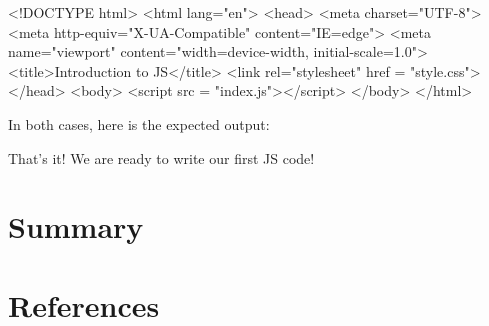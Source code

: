 \documentclass[
  letterpaper,
  DIV=11,
  numbers=noendperiod]{scrreprt}
\newenvironment{Shaded}{\begin{snugshade}}{\end{snugshade}}
\newcommand{\DataTypeTok}[1]{\textcolor[rgb]{0.68,0.00,0.00}{#1}}
\newcommand{\ErrorTok}[1]{\textcolor[rgb]{0.68,0.00,0.00}{#1}}
\newcommand{\KeywordTok}[1]{\textcolor[rgb]{0.00,0.23,0.31}{#1}}
\newcommand{\NormalTok}[1]{\textcolor[rgb]{0.00,0.23,0.31}{#1}}
\newcommand{\OtherTok}[1]{\textcolor[rgb]{0.00,0.23,0.31}{#1}}
\newcommand{\StringTok}[1]{\textcolor[rgb]{0.13,0.47,0.30}{#1}}
\newlength{\cslhangindent}
\newlength{\cslentryspacingunit} %
\newenvironment{CSLReferences}[2] %
 {%
  \setlength{\parindent}{0pt}
  \ifodd #1
  \let\oldpar\par
  \def\par{\hangindent=\cslhangindent\oldpar}
  \fi
  \setlength{\parskip}{#2\cslentryspacingunit}
 }%
 {}
\begin{document}
\begin{Shaded}
\begin{Highlighting}[]
\DataTypeTok{\textless{}!DOCTYPE }\NormalTok{html}\DataTypeTok{\textgreater{}}
\KeywordTok{\textless{}html} \ErrorTok{lang}\OtherTok{=}\StringTok{"en"}\KeywordTok{\textgreater{}}
\KeywordTok{\textless{}head\textgreater{}}
    \KeywordTok{\textless{}meta} \ErrorTok{charset}\OtherTok{=}\StringTok{"UTF{-}8"}\KeywordTok{\textgreater{}}
    \KeywordTok{\textless{}meta} \ErrorTok{http{-}equiv}\OtherTok{=}\StringTok{"X{-}UA{-}Compatible"} \ErrorTok{content}\OtherTok{=}\StringTok{"IE=edge"}\KeywordTok{\textgreater{}}
    \KeywordTok{\textless{}meta} \ErrorTok{name}\OtherTok{=}\StringTok{"viewport"} \ErrorTok{content}\OtherTok{=}\StringTok{"width=device{-}width, initial{-}scale=1.0"}\KeywordTok{\textgreater{}}
    \KeywordTok{\textless{}title\textgreater{}}\NormalTok{Introduction to JS}\KeywordTok{\textless{}/title\textgreater{}}
    \KeywordTok{\textless{}link} \ErrorTok{rel}\OtherTok{=}\StringTok{"stylesheet"} \ErrorTok{href} \OtherTok{=} \StringTok{"style.css"}\KeywordTok{\textgreater{}}
\KeywordTok{\textless{}/head\textgreater{}}
\KeywordTok{\textless{}body\textgreater{}}
    \KeywordTok{\textless{}script} \ErrorTok{src} \OtherTok{=} \StringTok{"index.js"}\KeywordTok{\textgreater{}\textless{}/script\textgreater{}}
\KeywordTok{\textless{}/body\textgreater{}}
\KeywordTok{\textless{}/html\textgreater{}}
\end{Highlighting}
\end{Shaded}

In both cases, here is the expected output:

That's it! We are ready to write our first JS code!


\hypertarget{summary}{%
\chapter{Summary}\label{summary}}


\hypertarget{references}{%
\chapter*{References}\label{references}}


\hypertarget{refs}{}
\begin{CSLReferences}{0}{0}
\end{CSLReferences}
\end{document}
